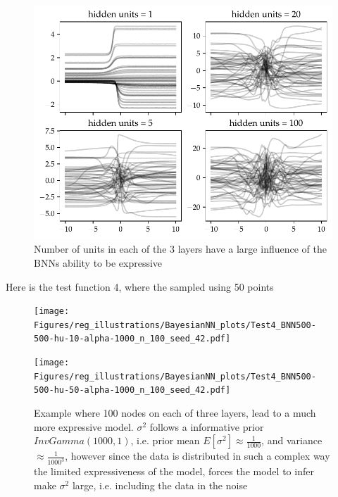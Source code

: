 \begin{figure}[H]
    \centering
    \includegraphics[width=\textwidth]{Pictures/bayesian_nn_prior_samples_hidden_units.pdf}
    \caption{Number of units in each of the 3 layers have a large influence of the BNNs ability to be expressive}
    \label{n_unit_BNN}
\end{figure}

Here is the test function 4, where the sampled using 50 points
\begin{figure}[h]
    \centering
    \begin{minipage}[b]{0.49\textwidth}
     \texttt{[image: Figures/reg\_illustrations/BayesianNN\_plots/Test4\_BNN500-500-hu-10-alpha-1000\_n\_100\_seed\_42.pdf]}
    \end{minipage}
    \hfill
    \begin{minipage}[b]{0.49\textwidth}
      \texttt{[image: Figures/reg\_illustrations/BayesianNN\_plots/Test4\_BNN500-500-hu-50-alpha-1000\_n\_100\_seed\_42.pdf]}
     \end{minipage}
     \caption{Example where 100 nodes on each of three layers, lead to a much more expressive model.
     $\sigma^2$ follows a informative prior $InvGamma(1000,1)$, i.e. prior mean $E[\sigma^2] \approx
     \frac{1}{1000}$, and variance $\approx \frac{1}{1000^3}$, however since the data is distributed in such 
     a complex way the limited expressiveness of the model, forces the model to infer make $\sigma^2$ large, 
     i.e. including the data in the noise}
\end{figure}


